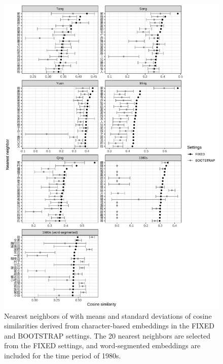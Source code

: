 \newpage
\begin{figure}[H]
  \centering
  \includegraphics[height=0.85\textheight,keepaspectratio]{figures_new/bootstrap_for_stability/neighbor_mean_and_sd_grey.pdf}
  \caption{Nearest neighbors of \jia with means and standard deviations of cosine similarities derived from character-based embeddings in the FIXED and BOOTSTRAP settings. The 20 nearest neighbors are selected from the FIXED settings, and word-segmented embeddings are included for the time period of 1980s.}
\end{figure}

